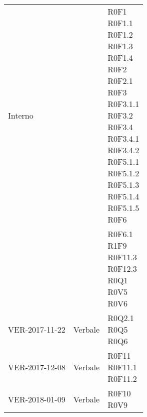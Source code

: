 \documentclass[AnalisiDeiRequisiti.tex]{subfiles}
\begin{document}
\begin{longtable}[H]{p{2cm}p{5cm}p{5cm}}
	\rowcolor{CRighePari}
	Interno & & \makecell[tl]{ R0F1 \\
	 R0F1.1 \\
	 R0F1.2 \\
	 R0F1.3 \\
	 R0F1.4 \\
	 R0F2 \\
	 R0F2.1 \\
	 R0F3 \\
	 R0F3.1.1 \\
	 R0F3.2 \\
	 R0F3.4 \\
	 R0F3.4.1 \\
	 R0F3.4.2 \\
	 R0F5.1.1 \\
	 R0F5.1.2 \\
	 R0F5.1.3 \\
	 R0F5.1.4 \\
	 R0F5.1.5 \\
	 R0F6
	 } \\
	& & \makecell[tl]{
	 R0F6.1 \\
	 R1F9 \\
	 R0F11.3 \\
	 R0F12.3 \\
	 R0Q1 \\
	 R0V5 \\
	 R0V6 } \\
	
	VER-2017-11-22 & Verbale & \makecell[tl]{ R0Q2.1 \\
	 R0Q5 \\
	 R0Q6 } \\
	
	VER-2017-12-08 & Verbale & \makecell[tl]{ R0F11 \\
	 R0F11.1 \\
	 R0F11.2 } \\
	VER-2018-01-09 & Verbale & \makecell[tl]{ R0F10 \\
	R0V9 } \\ 
	

\end{longtable}
\end{document}

